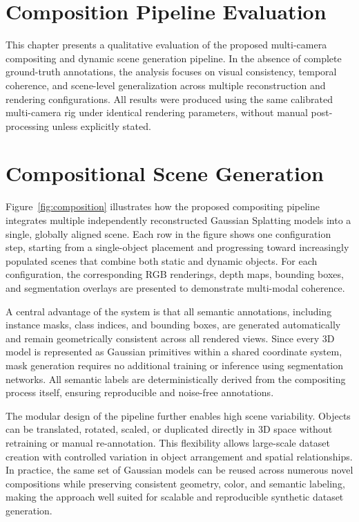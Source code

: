 \section{Composition Pipeline Evaluation}

This chapter presents a qualitative evaluation of the proposed multi-camera compositing and dynamic scene generation pipeline. 
In the absence of complete ground-truth annotations, the analysis focuses on visual consistency, temporal coherence, and scene-level generalization across multiple reconstruction and rendering configurations. 
All results were produced using the same calibrated multi-camera rig under identical rendering parameters, without manual post-processing unless explicitly stated.

\section{Compositional Scene Generation}
Figure~\ref{fig:composition} illustrates how the proposed compositing pipeline integrates multiple independently reconstructed Gaussian Splatting models into a single, globally aligned scene. 
Each row in the figure shows one configuration step, starting from a single-object placement and progressing toward increasingly populated scenes that combine both static and dynamic objects.
For each configuration, the corresponding RGB renderings, depth maps, bounding boxes, and segmentation overlays are presented to demonstrate multi-modal coherence.

A central advantage of the system is that all semantic annotations, including instance masks, class indices, and bounding boxes, are generated automatically and remain geometrically consistent across all rendered views. 
Since every 3D model is represented as Gaussian primitives within a shared coordinate system, mask generation requires no additional training or inference using segmentation networks. 
All semantic labels are deterministically derived from the compositing process itself, ensuring reproducible and noise-free annotations.

The modular design of the pipeline further enables high scene variability. 
Objects can be translated, rotated, scaled, or duplicated directly in 3D space without retraining or manual re-annotation. 
This flexibility allows large-scale dataset creation with controlled variation in object arrangement and spatial relationships. 
In practice, the same set of Gaussian models can be reused across numerous novel compositions while preserving consistent geometry, color, and semantic labeling, making the approach well suited for scalable and reproducible synthetic dataset generation.

